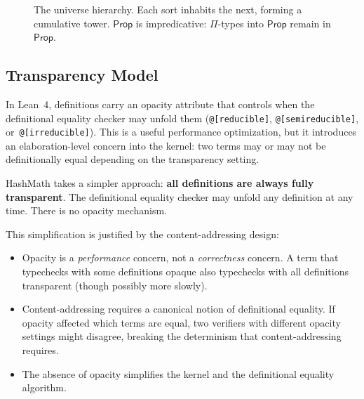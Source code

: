 \documentclass[11pt]{article}
\theoremstyle{definition}
\theoremstyle{plain}
\theoremstyle{remark}
\newcommand{\Prop}{\textsf{Prop}}
\newcommand{\Type}{\textsf{Type}}
\begin{document}
\begin{figure}[t]
\centering
{}
\caption{The universe hierarchy. Each sort inhabits the next, forming a cumulative tower.
$\Prop$ is impredicative: $\Pi$-types into $\Prop$ remain in $\Prop$.}
\label{fig:universes}
\end{figure}

\subsection{Transparency Model}
\label{sec:transparency}

In Lean~4, definitions carry an opacity attribute
that controls when the definitional equality checker may unfold them
(\texttt{@[reducible]}, \texttt{@[semireducible]}, or~\texttt{@[irreducible]}).
This is a useful performance optimization, but it introduces an
elaboration-level concern into the kernel: two terms may or may not be
definitionally equal depending on the transparency setting.

HashMath takes a simpler approach: \textbf{all definitions are always fully transparent}.
The definitional equality checker may unfold any definition at any time.
There is no opacity mechanism.

This simplification is justified by the content-addressing design:
\begin{itemize}[nosep]
  \item Opacity is a \emph{performance} concern, not a \emph{correctness} concern.
        A term that typechecks with some definitions opaque also typechecks with all definitions transparent (though possibly more slowly).
  \item Content-addressing requires a canonical notion of definitional equality.
        If opacity affected which terms are equal, two verifiers with different opacity settings might disagree, breaking the determinism that content-addressing requires.
  \item The absence of opacity simplifies the kernel and the definitional equality algorithm.
\end{itemize}
\end{document}
